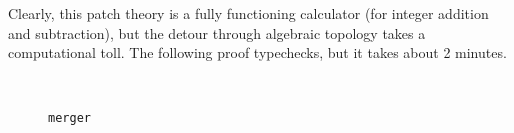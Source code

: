 Clearly, this patch theory is a fully functioning calculator (for integer addition and subtraction),
but the detour through algebraic topology takes a computational toll.
The following proof typechecks, but it takes about 2 minutes.
\begin{code}%
%
\>[2]\AgdaFunction{\AgdaUnderscore{}}\AgdaSpace{}%
\AgdaSymbol{:}\AgdaSpace{}%
\AgdaSpace{}%
\AgdaSymbol{(}\AgdaSpace{}%
\AgdaSymbol{)}\AgdaSpace{}%
\AgdaSpace{}%
\AgdaSpace{}%
\<%
\\
%
\>[2]\AgdaSymbol{\AgdaUnderscore{}}\AgdaSpace{}%
\AgdaSymbol{=}\AgdaSpace{}%
\<%
\end{code}

\begin{figure}
\begin{centering}
\caption{\texttt{merger}}
\label{fig:elementary-merger}
\end{centering}
\end{figure}

